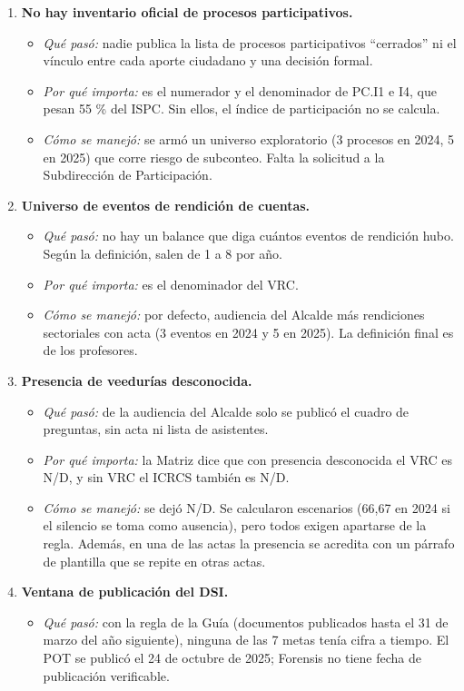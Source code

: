 \documentclass[11pt,letterpaper]{article}
\begin{document}
\begin{enumerate}
\item \textbf{No hay inventario oficial de procesos participativos.}
\begin{itemize}
\item \emph{Qué pasó:} nadie publica la lista de procesos participativos ``cerrados'' ni el vínculo entre cada aporte ciudadano y una decisión formal.
\item \emph{Por qué importa:} es el numerador y el denominador de PC.I1 e I4, que pesan 55 \% del ISPC. Sin ellos, el índice de participación no se calcula.
\item \emph{Cómo se manejó:} se armó un universo exploratorio (3 procesos en 2024, 5 en 2025) que corre riesgo de subconteo. Falta la solicitud a la Subdirección de Participación.
\end{itemize}
\item \textbf{Universo de eventos de rendición de cuentas.}
\begin{itemize}
\item \emph{Qué pasó:} no hay un balance que diga cuántos eventos de rendición hubo. Según la definición, salen de 1 a 8 por año.
\item \emph{Por qué importa:} es el denominador del VRC.
\item \emph{Cómo se manejó:} por defecto, audiencia del Alcalde más rendiciones sectoriales con acta (3 eventos en 2024 y 5 en 2025). La definición final es de los profesores.
\end{itemize}
\item \textbf{Presencia de veedurías desconocida.}
\begin{itemize}
\item \emph{Qué pasó:} de la audiencia del Alcalde solo se publicó el cuadro de preguntas, sin acta ni lista de asistentes.
\item \emph{Por qué importa:} la Matriz dice que con presencia desconocida el VRC es N/D, y sin VRC el ICRCS también es N/D.
\item \emph{Cómo se manejó:} se dejó N/D. Se calcularon escenarios (66,67 en 2024 si el silencio se toma como ausencia), pero todos exigen apartarse de la regla. Además, en una de las actas la presencia se acredita con un párrafo de plantilla que se repite en otras actas.
\end{itemize}
\item \textbf{Ventana de publicación del DSI.}
\begin{itemize}
\item \emph{Qué pasó:} con la regla de la Guía (documentos publicados hasta el 31 de marzo del año siguiente), ninguna de las 7 metas tenía cifra a tiempo. El POT se publicó el 24 de octubre de 2025; Forensis no tiene fecha de publicación verificable.

\end{itemize}
\end{enumerate}
\end{document}
